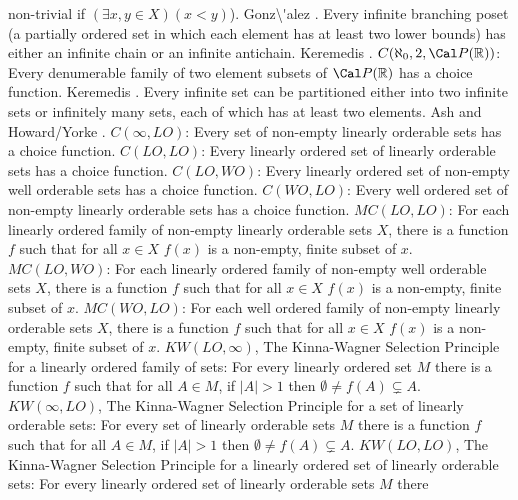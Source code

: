 non-trivial if $(\exists x,y\in X)(x < y)$).  \ac{Gonz\'alez}
\cite{1995a}.
\medskip
{} Every infinite branching poset (a partially
ordered set in which each element has at least two lower bounds) has
either an infinite chain or an infinite antichain. \ac{Keremedis}
\cite{1999a}.
\medskip
{} $C(\aleph_0,2,\Cal P({\Bbb R}))$: Every
denumerable family of two element subsets of $\Cal P({\Bbb R})$ has
a choice function.  \ac{Keremedis} \cite{1999b}.
\medskip
{} Every infinite set can be partitioned either
into two infinite sets or infinitely many sets, each of which has at
least two elements. \ac{Ash} \cite{1983} and \ac{Howard/Yorke}
\cite{1989}.
\medskip
{} $C(\infty,LO)$: Every set of non-empty
linearly orderable sets has a choice function.
\medskip
{} $C(LO,LO)$: Every linearly ordered set of
linearly orderable sets has a choice function.
\medskip
{} $C(LO,WO)$: Every linearly ordered set of
non-empty well orderable sets has a choice function.
\medskip
{} $C(WO,LO)$: Every well ordered set of
non-empty linearly orderable sets has a choice function.
\medskip
{} $MC(LO,LO)$: For each linearly ordered family
of non-empty linearly orderable sets $X$, there is a function $f$ such
that for all $x\in X$ $f(x)$ is a non-empty, finite subset of $x$.
\medskip
{} $MC(LO,WO)$: For each linearly ordered family
of non-empty well orderable sets $X$, there is a function $f$ such
that for all $x\in X$ $f(x)$ is a non-empty, finite subset of $x$.
\medskip
{} $MC(WO,LO)$: For each well ordered family
of non-empty linearly orderable sets $X$, there is a function $f$ such
that for all $x\in X$ $f(x)$ is a non-empty, finite subset of $x$.
\medskip
{} $KW(LO,\infty)$, The Kinna-Wagner Selection
Principle for a linearly ordered family of sets: For every linearly
ordered set $M$ there is a function $f$ such that for all $A\in M$,
if $|A|>1$ then $\emptyset\neq f(A)\subsetneq A$.
\medskip
{} $KW(\infty,LO)$, The Kinna-Wagner Selection
Principle for a set of linearly orderable sets: For every set of
linearly orderable sets $M$ there is a function $f$ such that for all
$A\in M$, if $|A|>1$ then $\emptyset\neq f(A)\subsetneq A$.
\medskip
{} $KW(LO,LO)$, The Kinna-Wagner Selection
Principle for a linearly ordered set of linearly orderable sets:
For every linearly ordered set of linearly orderable sets $M$ there
